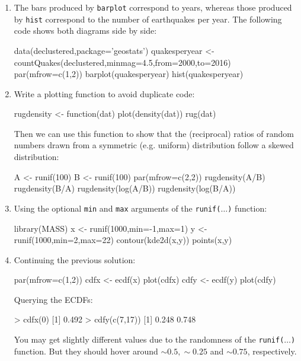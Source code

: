 \begin{enumerate}

\item The bars produced by \texttt{barplot} correspond to years,
  whereas those produced by \texttt{hist} correspond to the number of
  earthquakes per year. The following code shows both diagrams side by
  side:
  
\begin{script}
data(declustered,package='geostats')
quakesperyear <- countQuakes(declustered,minmag=4.5,from=2000,to=2016)
par(mfrow=c(1,2))
barplot(quakesperyear)
hist(quakesperyear)
\end{script}

\item\label{it:ABsol} Write a plotting function to avoid duplicate
  code:

\begin{script}
rugdensity <- function(dat){
  plot(density(dat))
  rug(dat)
}
\end{script}

Then we can use this function to show that the (reciprocal) ratios of
random numbers drawn from a symmetric (e.g. uniform) distribution
follow a skewed distribution:

\begin{script}[firstnumber=5]
A <- runif(100)
B <- runif(100)
par(mfrow=c(2,2))
rugdensity(A/B)
rugdensity(B/A)
rugdensity(log(A/B))
rugdensity(log(B/A))
\end{script}

\item\label{it:xyrandsol} Using the optional \texttt{min} and
  \texttt{max} arguments of the \texttt{runif($\ldots$)} function:

\begin{script}
library(MASS)
x <- runif(1000,min=-1,max=1)
y <- runif(1000,min=2,max=22)
contour(kde2d(x,y))
points(x,y)
\end{script}

\item Continuing the previous solution:

\begin{script}[firstnumber=6]
par(mfrow=c(1,2))
cdfx <- ecdf(x)
plot(cdfx)
cdfy <- ecdf(y)
plot(cdfy)
\end{script}

Querying the ECDFs:

\begin{console}
> cdfx(0)
[1] 0.492
> cdfy(c(7,17))
[1] 0.248 0.748
\end{console}

You may get slightly different values due to the randomness of the
\texttt{runif($\ldots$)} function. But they should hover around
$\sim{0.5}, \sim{0.25}$ and $\sim{0.75}$, respectively.

\end{enumerate}
  
